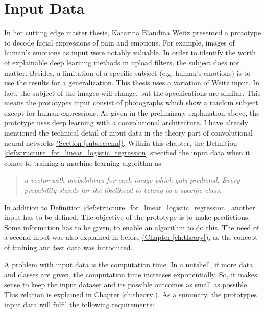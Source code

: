 \section{Input Data}

In her cutting edge master thesis, Katarina Blandina Weitz presented a prototype to decode facial expressions of pain and emotions. For example, images of human's emotions as input were notably valuable. In order to identify the worth of explainable deep learning methods in upload filters, the subject does not matter. Besides, a limitation of a specific subject (e.g. human's emotions) is to use the results for a generalization. This thesis uses a variation of Weitz input. In fact, the subject of the images will change, but the specifications are similar. This means the prototypes input consist of photographs which show a random subject except for human expressions. As given in the preliminary explanation above, the prototype uses deep learning with a convolutional architecture. I have already mentioned the technical detail of input data in the theory part of convolutional neural networks \hyperref[subsec:cnn]{(Section \ref{subsec:cnn})}. Within this chapter, the Definition \ref{def:structure_for_linear_logistic_regression} specified the input data when it comes to training a machine learning algorithm as 

\begin{quote}
	\textit{a vector with probabilities for each image which gots predicted. Every probability stands for the likelihood to belong to a specific class.}
\end{quote}

In addition to \hyperref[def:structure_for_linear_logistic_regressionn]{Definition \ref{def:structure_for_linear_logistic_regression}}, another input has to be defined. The objective of the prototype is to make predictions. Some information has to be given, to enable an algorithm to do this. The need of a second input was also explained in before \hyperref[ch:theory]{(Chapter \ref{ch:theory})}, as the concept of training and test data was introduced.

A problem with input data is the computation time. In a nutshell, if more data and classes are given, the computation time increases exponentially. So, it makes sense to keep the input dataset and its possible outcomes as small as possible. This relation is explained in \hyperref[ch:theory]{Chapter \ref{ch:theory})}. As a summary, the prototypes input data will fulfil the following requirements:

